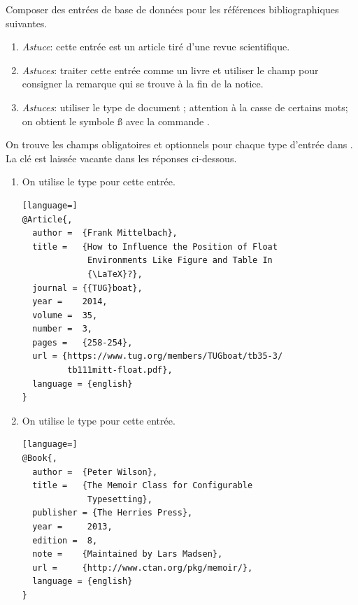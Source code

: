 \begin{exercice}
  Composer des entrées de base de données pour les références
  bibliographiques suivantes.
  \begin{enumerate}
  \item {}

    \emph{Astuce}: cette entrée est un article tiré d'une revue
    scientifique.

  \item {}

    \emph{Astuces}: traiter cette entrée comme un livre et utiliser le
    champ  pour consigner la remarque qui se trouve à la
    fin de la notice.

  \item {}

    \emph{Astuces}: utiliser le type de document ;
    attention à la casse de certains mots; on obtient le symbole {\ss}
    avec la commande \cmdprint{\ss}.
  \end{enumerate}
  \begin{sol}
    On trouve les champs obligatoires et optionnels pour chaque type
    d'entrée dans %
    . %
    La clé est laissée vacante dans les réponses ci-dessous.
    \begin{enumerate}
    \item On utilise le type  pour cette entrée.
\begin{lstlisting}[language=]
@Article{,
  author =  {Frank Mittelbach},
  title =   {How to Influence the Position of Float
             Environments Like Figure and Table In
             {\LaTeX}?},
  journal = {{TUG}boat},
  year =    2014,
  volume =  35,
  number =  3,
  pages =   {258-254},
  url = {https://www.tug.org/members/TUGboat/tb35-3/
         tb111mitt-float.pdf},
  language = {english}
}
\end{lstlisting}

    \item On utilise le type  pour cette entrée.
\begin{lstlisting}[language=]
@Book{,
  author =  {Peter Wilson},
  title =   {The Memoir Class for Configurable
             Typesetting},
  publisher = {The Herries Press},
  year =     2013,
  edition =  8,
  note =    {Maintained by Lars Madsen},
  url =     {http://www.ctan.org/pkg/memoir/},
  language = {english}
}
\end{lstlisting}


\end{enumerate}
\end{sol}
\end{exercice}
